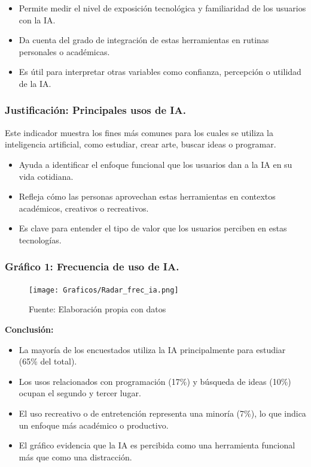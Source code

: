 \documentclass[12pt, a4paper]{article}
\begin{document}
\begin{itemize}
    \item Permite medir el nivel de exposición tecnológica y familiaridad de los usuarios con la IA.
    \item Da cuenta del grado de integración de estas herramientas en rutinas personales o académicas.
    \item Es útil para interpretar otras variables como confianza, percepción o utilidad de la IA.
\end{itemize}

\subsubsection*{Justificación: Principales usos de IA.}
Este indicador muestra los fines más comunes para los cuales se utiliza la inteligencia artificial, como estudiar, crear arte, buscar ideas o programar.

\begin{itemize}
    \item Ayuda a identificar el enfoque funcional que los usuarios dan a la IA en su vida cotidiana.
    \item Refleja cómo las personas aprovechan estas herramientas en contextos académicos, creativos o recreativos.
    \item Es clave para entender el tipo de valor que los usuarios perciben en estas tecnologías.
\end{itemize}


\subsubsection*{Gráfico 1: Frecuencia de uso de IA.}
\begin{figure}[H]
    \centering
    \texttt{[image: Graficos/Radar\_frec\_ia.png]}
    \caption[1]{Fuente: Elaboración propia con datos}
\end{figure}

\textbf{Conclusión:}
\begin{itemize}
    \item La mayoría de los encuestados utiliza la IA principalmente para estudiar (65\% del total).
    \item Los usos relacionados con programación (17\%) y búsqueda de ideas (10\%) ocupan el segundo y tercer lugar.
    \item El uso recreativo o de entretención representa una minoría (7\%), lo que indica un enfoque más académico o productivo.
    \item El gráfico evidencia que la IA es percibida como una herramienta funcional más que como una distracción.
\end{itemize}
\end{document}
